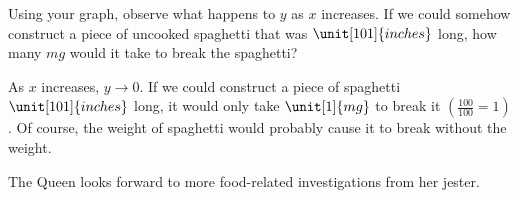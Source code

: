 \begin{problem}
\begin{subproblem}
\begin{shortsolution}
\end{shortsolution}
\end{subproblem}
\begin{subproblem}
Using your graph, observe what happens to $y$ as $x$ increases. If we could somehow
construct a piece of uncooked spaghetti that was $\unit[101]{inches}$ long, how many 
$\unit{mg}$ would it take to break the spaghetti?
\begin{shortsolution}
As $x$ increases, $y\rightarrow 0$. If we could construct a piece of spaghetti 
$\unit[101]{inches}$ long, it would only take $\unit[1]{mg}$ to break it $\left(\frac{100}{100}=1\right)$. Of course, 
the weight of spaghetti would probably cause it to break without the weight.
\end{shortsolution}
\end{subproblem}
The Queen looks forward to more food-related investigations from her jester.
\end{problem}



